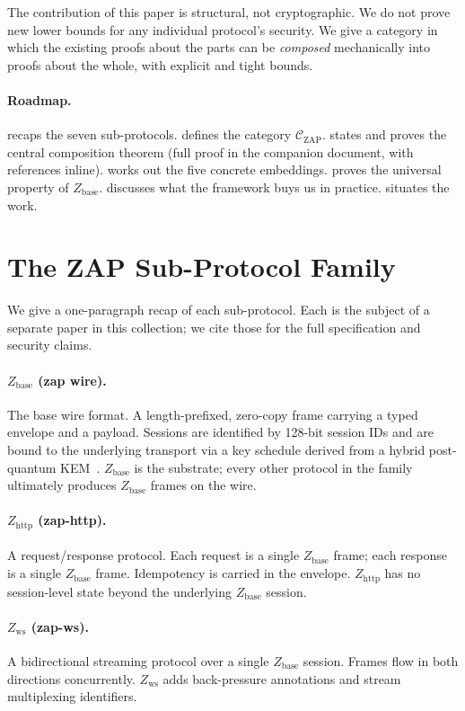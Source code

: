 \documentclass[11pt]{article}
\theoremstyle{definition}
\theoremstyle{remark}
\newcommand{\CZ}{\mathcal{C}_{\mathrm{ZAP}}}
\newcommand{\Zb}{Z_{\mathrm{base}}}
\newcommand{\Zh}{Z_{\mathrm{http}}}
\newcommand{\Zw}{Z_{\mathrm{ws}}}
\begin{document}
The contribution of this paper is structural, not cryptographic. We
do not prove new lower bounds for any individual protocol's security.
We give a category in which the existing proofs about the parts can
be \emph{composed} mechanically into proofs about the whole, with
explicit and tight bounds.

\paragraph{Roadmap.}  recaps the seven sub-protocols.
 defines the category $\CZ$.
 states and proves the central composition
theorem (full proof in the companion document, with references
inline).  works out the five concrete embeddings.
 proves the universal property of $\Zb$.
 discusses what the framework buys us in
practice.  situates the work.

\section{The ZAP Sub-Protocol Family}
\label{sec:family}

We give a one-paragraph recap of each sub-protocol. Each is the
subject of a separate paper in this collection; we cite those for
the full specification and security claims.

\paragraph{$\Zb$ (zap wire).} The base wire format. A length-prefixed,
zero-copy frame carrying a typed envelope and a payload. Sessions are
identified by 128-bit session IDs and are bound to the underlying
transport via a key schedule derived from a hybrid post-quantum
KEM~\cite{zap2026pq}. $\Zb$ is the substrate; every other protocol in
the family ultimately produces $\Zb$ frames on the wire.

\paragraph{$\Zh$ (zap-http).} A request/response protocol. Each
request is a single $\Zb$ frame; each response is a single $\Zb$
frame. Idempotency is carried in the envelope. $\Zh$ has no
session-level state beyond the underlying $\Zb$ session.

\paragraph{$\Zw$ (zap-ws).} A bidirectional streaming protocol over a
single $\Zb$ session. Frames flow in both directions concurrently.
$\Zw$ adds back-pressure annotations and stream multiplexing identifiers.
\end{document}
